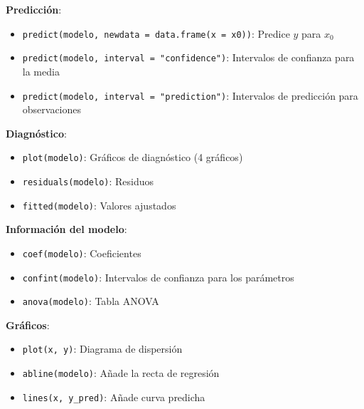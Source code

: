 \documentclass[10pt,a4paper]{article}
\begin{document}
\begin{tcolorbox}[title=Funciones Adicionales]
    \textbf{Predicción}:
    \begin{itemize}
        \item \texttt{predict(modelo, newdata = data.frame(x = x0))}: Predice $y$ para $x_0$
        \item \texttt{predict(modelo, interval = "confidence")}: Intervalos de confianza para la media
        \item \texttt{predict(modelo, interval = "prediction")}: Intervalos de predicción para observaciones
    \end{itemize}
    
    \textbf{Diagnóstico}:
    \begin{itemize}
        \item \texttt{plot(modelo)}: Gráficos de diagnóstico (4 gráficos)
        \item \texttt{residuals(modelo)}: Residuos
        \item \texttt{fitted(modelo)}: Valores ajustados
    \end{itemize}
    
    \textbf{Información del modelo}:
    \begin{itemize}
        \item \texttt{coef(modelo)}: Coeficientes
        \item \texttt{confint(modelo)}: Intervalos de confianza para los parámetros
        \item \texttt{anova(modelo)}: Tabla ANOVA
    \end{itemize}
    
    \textbf{Gráficos}:
    \begin{itemize}
        \item \texttt{plot(x, y)}: Diagrama de dispersión
        \item \texttt{abline(modelo)}: Añade la recta de regresión
        \item \texttt{lines(x, y\_pred)}: Añade curva predicha
    \end{itemize}
\end{tcolorbox}
\end{document}
